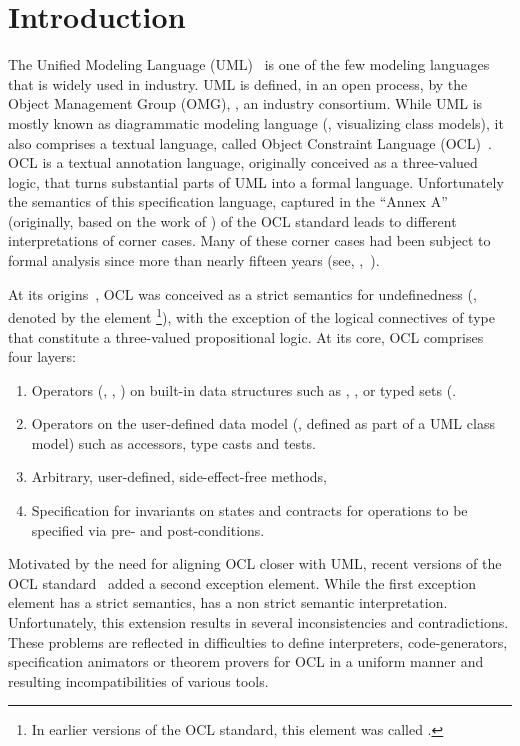 \section{Introduction}
\isatagafp%
The Unified Modeling Language
(UML)~\cite{omg:uml-infrastructure:2011,omg:uml-superstructure:2011}
is one of the few modeling languages that is widely used in
industry. UML is defined, in an open process, by the Object Management
Group (OMG), \ie, an industry consortium.  While UML is mostly known
as diagrammatic modeling language (\eg, visualizing class models), it
also comprises a textual language, called Object Constraint Language
(OCL)~\cite{omg:ocl:2012}. OCL is a textual annotation language,
originally conceived as a three-valued logic, that turns substantial
parts of UML into a formal language.  Unfortunately the semantics of
this specification language, captured in the ``Annex A'' (originally,
based on the work of \citet{richters:precise:2002}) of the OCL
standard leads to different interpretations of corner cases.  Many of
these corner cases had been subject to formal analysis since more than
nearly fifteen years (see,
\eg,~\cite{brucker.ea:semantic:2006-b,brucker.ea:proposal:2002,mandel.ea:ocl:1999,
  hamie.ea:reflections:1998,cook.ea::amsterdam:2002}).

At its origins~\cite{richters:precise:2002,omg:ocl:1997}, OCL was
conceived as a strict semantics for undefinedness (\eg, denoted by the
element \footnote{In earlier versions of the OCL
  standard, this element was called .}), with
the exception of the logical connectives of type 
that constitute a three-valued propositional logic. At its core, OCL
comprises four layers:
\begin{enumerate}
\item Operators (\eg, , \inlineocl{_ + _}) on
  built-in data structures such as ,
  , or typed sets (.
\item Operators on the user-defined data model (\eg, defined as part
  of a UML class model) such as accessors, type casts and tests.
\item Arbitrary, user-defined, side-effect-free methods,
\item Specification for invariants on states and contracts for
  operations to be specified via pre- and post-conditions.
\end{enumerate}

Motivated by the need for aligning OCL closer with UML, recent
versions of the OCL standard~\cite{omg:ocl:2006,omg:ocl:2012} added a
second exception element.  While the first exception element
 has a strict semantics,  has a non
strict semantic interpretation.  Unfortunately, this extension results
in several inconsistencies and contradictions. These problems are
reflected in difficulties to define interpreters, code-generators,
specification animators or theorem provers for OCL in a uniform manner
and resulting incompatibilities of various tools.


